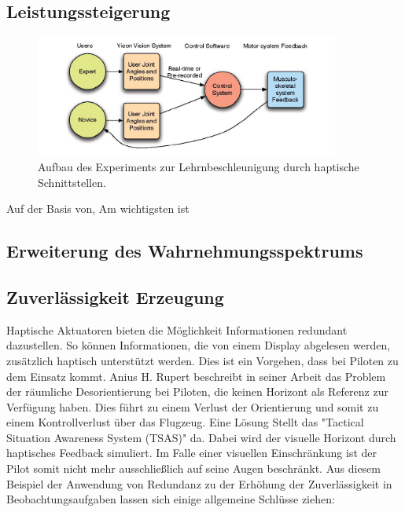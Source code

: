 \documentclass{llncs}					%
\begin{document}
\subsection{Leistungssteigerung}

\begin{figure}[htbp]
	\begin{center}
		\includegraphics[width = 10cm]{Grafiken/17-Lehrnbeschleunigung-Versuchsaufbau.png}
		\caption{Aufbau des Experiments zur Lehrnbeschleunigung durch haptische Schnittstellen\cite{lieberman2007development}.}
		\label{17-Lehrnbeschleunigung-Versuchsaufbau}
	\end{center}
\end{figure}

Auf der Basis von\cite{rupert2000instrumentation},\cite{calhoun2002utilty}
Am wichtigsten ist \cite{lieberman2007development}

\subsection{Erweiterung des Wahrnehmungsspektrums}


\subsection{Zuverlässigkeit Erzeugung}
Haptische Aktuatoren bieten die Möglichkeit Informationen redundant dazustellen. So können Informationen, die von einem Display abgelesen werden, zusätzlich haptisch unterstützt werden. Dies ist ein Vorgehen, dass bei Piloten zu dem Einsatz kommt.
Anius H. Rupert\cite{rupert2000instrumentation} beschreibt in seiner Arbeit das Problem der räumliche Desorientierung bei Piloten, die keinen Horizont als Referenz zur Verfügung haben. Dies führt zu einem Verlust der Orientierung und somit zu einem Kontrollverlust über das Flugzeug. Eine Lösung Stellt das "Tactical Situation Awareness System (TSAS)"\cite{rupert2000instrumentation} da. Dabei wird der visuelle Horizont durch haptisches Feedback simuliert\cite{rupert2000instrumentation}. Im Falle einer visuellen Einschränkung ist der Pilot somit nicht mehr ausschließlich auf seine Augen beschränkt.
Aus diesem Beispiel der Anwendung von Redundanz zu der Erhöhung der Zuverlässigkeit in Beobachtungsaufgaben lassen sich einige allgemeine Schlüsse ziehen:
\end{document}
